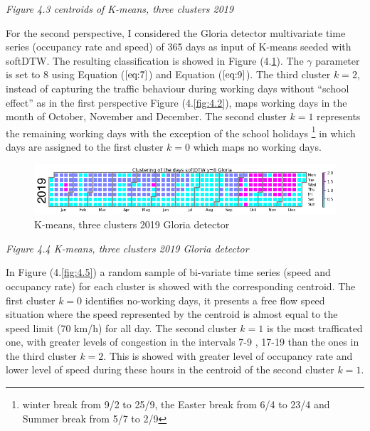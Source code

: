 \documentclass[11pt]{article}
\begin{document}
\emph{\small Figure 4.3  centroids of K-means, three clusters 2019}

    For the second perspective, I considered the Gloria detector
multivariate time series (occupancy rate and speed) of 365 days as input
of K-means seeded with softDTW. The resulting classification is showed
in Figure (4.\ref{fig:4.4}). The \(\gamma\) parameter is set to 8 using
Equation (\(\ref{eq:7}\)) and Equation (\(\ref{eq:9}\)). The third
cluster \(k=2\), instead of capturing the traffic behaviour during
working days without ``school effect'' as in the first perspective
Figure (4.\ref{fig:4.2}), maps working days in the month of October,
November and December. The second cluster \(k=1\) represents the
remaining working days with the exception of the school holidays
\footnote{winter break from 9/2 to 25/9, the Easter break from 6/4 to 23/4 and Summer break from 5/7 to 2/9}
in which days are assigned to the first cluster \(k=0\) which maps no
working days.

    \begin{figure}
    \centering
    \includegraphics{softDTW K=3 gloria 2019.png}
    \caption{K-means, three clusters 2019 Gloria detector}
    \label{fig:4.4}
\end{figure}

\emph{\small Figure 4.4 K-means, three clusters 2019 Gloria detector}

    In Figure (4.\ref{fig:4.5}) a random sample of bi-variate time series
(speed and occupancy rate) for each cluster is showed with the
corresponding centroid. The first cluster \(k=0\) identifies no-working
days, it presents a free flow speed situation where the speed
represented by the centroid is almost equal to the speed limit (70 km/h)
for all day. The second cluster \(k=1\) is the most trafficated one,
with greater levels of congestion in the intervals 7-9 , 17-19 than the
ones in the third cluster \(k=2\). This is showed with greater level of
occupancy rate and lower level of speed during these hours in the
centroid of the second cluster \(k=1\).
\end{document}
